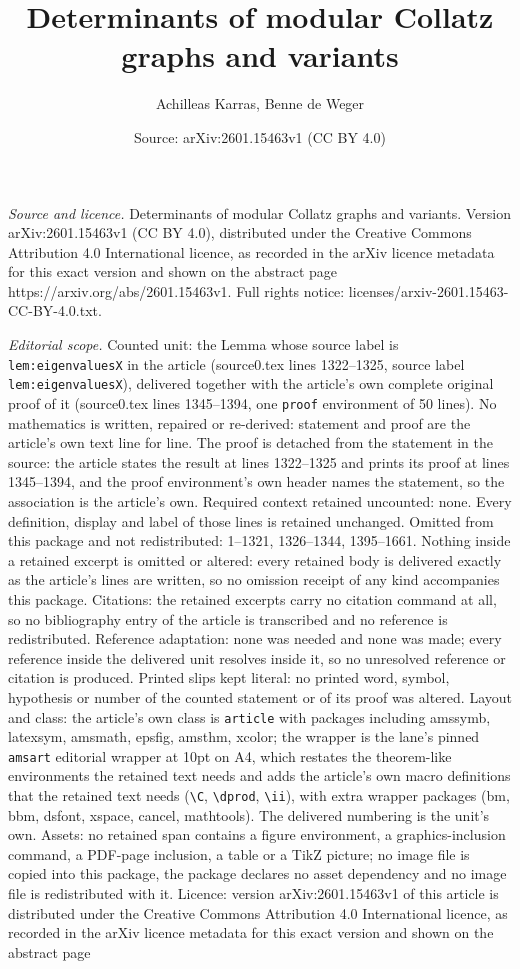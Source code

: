 \documentclass[10pt,a4paper]{amsart}
\title[Determinants of modular Collatz graphs and variants]{Determinants of modular Collatz graphs and variants}
\author{Achilleas Karras, Benne de Weger}
\date{Source: arXiv:2601.15463v1 (CC BY 4.0)}
\begin{document}
\maketitle

\noindent\emph{Source and licence.} Determinants of modular Collatz graphs and variants. Version arXiv:2601.15463v1 (CC BY 4.0), distributed under the Creative Commons Attribution 4.0 International licence, as recorded in the arXiv licence metadata for this exact version and shown on the abstract page https://arxiv.org/abs/2601.15463v1. Full rights notice: licenses/arxiv-2601.15463-CC-BY-4.0.txt.\par\smallskip

\noindent\textit{Editorial scope.} Counted unit: the Lemma whose source label is \texttt{lem:eigenvaluesX} in the article (source0.tex lines 1322--1325, source label \texttt{lem:eigenvaluesX}), delivered together with the article's own complete original proof of it (source0.tex lines 1345--1394, one \texttt{proof} environment of 50 lines). No mathematics is written, repaired or re-derived: statement and proof are the article's own text line for line. The proof is detached from the statement in the source: the article states the result at lines 1322--1325 and prints its proof at lines 1345--1394, and the proof environment's own header names the statement, so the association is the article's own. Required context retained uncounted: none. Every definition, display and label of those lines is retained unchanged. Omitted from this package and not redistributed: 1--1321, 1326--1344, 1395--1661. Nothing inside a retained excerpt is omitted or altered: every retained body is delivered exactly as the article's lines are written, so no omission receipt of any kind accompanies this package. Citations: the retained excerpts carry no citation command at all, so no bibliography entry of the article is transcribed and no reference is redistributed. Reference adaptation: none was needed and none was made; every reference inside the delivered unit resolves inside it, so no unresolved reference or citation is produced. Printed slips kept literal: no printed word, symbol, hypothesis or number of the counted statement or of its proof was altered. Layout and class: the article's own class is \texttt{article} with packages including amssymb, latexsym, amsmath, epsfig, amsthm, xcolor; the wrapper is the lane's pinned \texttt{amsart} editorial wrapper at 10pt on A4, which restates the theorem-like environments the retained text needs and adds the article's own macro definitions that the retained text needs (\texttt{\textbackslash C}, \texttt{\textbackslash dprod}, \texttt{\textbackslash ii}), with extra wrapper packages (bm, bbm, dsfont, xspace, cancel, mathtools). The delivered numbering is the unit's own. Assets: no retained span contains a figure environment, a graphics-inclusion command, a PDF-page inclusion, a table or a TikZ picture; no image file is copied into this package, the package declares no asset dependency and no image file is redistributed with it. Licence: version arXiv:2601.15463v1 of this article is distributed under the Creative Commons Attribution 4.0 International licence, as recorded in the arXiv licence metadata for this exact version and shown on the abstract page 
\end{document}

